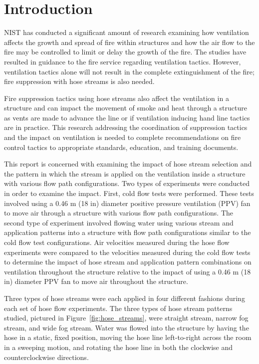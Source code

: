 \documentclass[12pt,oneside]{book}
\begin{document}
\mainmatter

\chapter{Introduction}
\label{chap:Introduction}
NIST has conducted a significant amount of research examining how ventilation affects the growth and spread of fire within structures and how the air flow to the fire may be controlled to limit or delay the growth of the fire. The studies have resulted in guidance to the fire service regarding ventilation tactics. However, ventilation tactics alone will not result in the complete extinguishment of the fire; fire suppression with hose streams is also needed.

Fire suppression tactics using hose streams also affect the ventilation in a structure and can impact the movement of smoke and heat through a structure as vents are made to advance the line or if ventilation inducing hand line tactics are in practice. This research addressing the coordination of suppression tactics and the impact on ventilation is needed to complete recommendations on fire control tactics to appropriate standards, education, and training documents.

This report is concerned with examining the impact of hose stream selection and the pattern in which the stream is applied on the ventilation inside a structure with various flow path configurations. Two types of experiments were conducted in order to examine the impact. First, cold flow tests were performed. These tests involved using a 0.46 m (18 in) diameter positive pressure ventilation (PPV) fan to move air through a structure with various flow path configurations. The second type of experiment involved flowing water using various stream and application patterns into a structure with flow path configurations similar to the cold flow test configurations. Air velocities measured during the hose flow experiments were compared to the velocities measured during the cold flow tests to determine the impact of hose stream and application pattern combinations on ventilation throughout the structure relative to the impact of using a 0.46 m (18 in) diameter PPV fan to move air throughout the structure. 

Three types of hose streams were each applied in four different fashions during each set of hose flow experiments. The three types of hose stream patterns studied, pictured in Figure~\ref{fig:hose_streams}, were straight stream, narrow fog stream, and wide fog stream. Water was flowed into the structure by having the hose in a static, fixed position, moving the hose line left-to-right across the room in a sweeping motion, and rotating the hose line in both the clockwise and counterclockwise directions.
\end{document}
